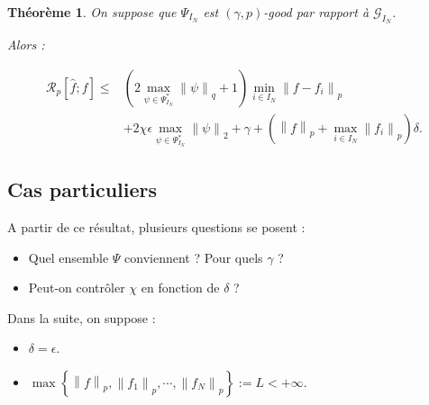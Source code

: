 \documentclass[11pt,letterpaper]{article}
\newtheorem{theorem}{Théorème}
\begin{document}
\begin{theorem}
\par On suppose que $\Psi_{I_N}$ est $\left( \gamma, p \right)$-good par rapport à $\mathcal{G}_{I_N}$.

\par Alors :

\begin{equation}
	\begin{split}
		\mathcal{R}_p \left[ \hat{f}; f\right] \leq & \left( 2 \max\limits_{\psi \in \Psi_{I_N}^{*}} \left\| \psi \right\|_q + 1 \right) \min\limits_{i \in I_N} \left\| f - f_i \right\|_p \\
		& + 2 \chi \epsilon \max\limits_{\psi \in \Psi_{I_N}^{*}} \left\| \psi \right\|_2 + \gamma + \left( \left\| f \right\|_p + \max\limits_{i \in I_N} \left\| f_i \right\|_p \right) \delta .
	\end{split}
\end{equation}

\end{theorem}

\subsection{Cas particuliers}

\par A partir de ce résultat, plusieurs questions se posent :
\begin{itemize}
\item Quel ensemble $\Psi$ conviennent ? Pour quels $\gamma$ ?
\item Peut-on contrôler $\chi$ en fonction de $\delta$ ?
\end{itemize}

\par Dans la suite, on suppose :
\begin{itemize}
\item $\delta = \epsilon$.
\item $\max \left\lbrace \left\| f \right\|_p, \left\| f_1 \right\|_p , \cdots, \left\| f_N \right\|_p \right\rbrace := L < + \infty$.
\end{itemize}
\end{document}
